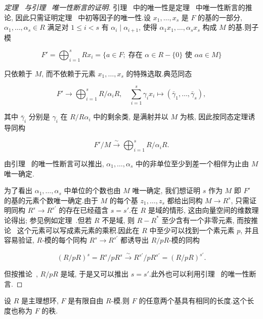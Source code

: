 \begin{proof}[定理~ 与引理~ 唯一性断言的证明]
引理~ 中的唯一性是定理~ 中唯一性断言的推论, 因此只需证明定理~ 中初等因子的唯一性.设 $x_1, \ldots, x_s$ 是 $F$ 的基的一部分, $\alpha_1, \ldots, \alpha_s \in R$ 满足对 $1 \leq i < s$ 有 $\alpha_i \mid \alpha_{i + 1}$, 使得 $\alpha_1 x_1, \ldots, \alpha_s x_s$ 构成 $M$ 的基.则子模

\[
F' = \bigoplus_{i = 1}^{s} R x_i = \{a \in F;\; \text{存在 } \alpha \in R - \{0\} \text{ 使 } \alpha a \in M\}\]

只依赖于 $M$, 而不依赖于元素 $x_1, \ldots, x_s$ 的特殊选取.典范同态

\[
F' \longrightarrow \bigoplus_{i = 1}^{s} R/\alpha_i R, \quad \sum_{i = 1}^{s} \gamma_i x_i \longmapsto (\bar{\gamma}_1, \ldots, \bar{\gamma}_s),\]

其中 $\bar{\gamma}_i$ 分别是 $\gamma_i$ 在 $R/R\alpha_i$ 中的剩余类, 是满射并以 $M$ 为核, 因此按同态定理诱导同构

\[
F'/M \xrightarrow{\sim} \bigoplus_{i = 1}^{s} R/\alpha_i R\text{.}\]

由引理~ 的唯一性断言可以推出, $\alpha_1, \ldots, \alpha_s$ 中的非单位至少到差一个相伴为止由 $M$ 唯一确定.

为了看出 $\alpha_1, \ldots, \alpha_s$ 中单位的个数也由 $M$ 唯一确定, 我们想证明 $s$ 作为 $M$ 即 $F'$ 的基的元素个数唯一确定.由于 $M$ 的每个基 $z_1, \ldots, z_s$ 都给出同构 $M \longrightarrow R^s$, 只需证明同构 $R^s \longrightarrow R^{s'}$ 的存在已经蕴含 $s = s'$.在 $R$ 是域的情形, 这由向量空间的维数理论得出; 参见例如定理~.但若 $R$ 不是域, 则 $R - R^*$ 至少含有一个非零元素, 而按推论~ 这个元素可以写成素元素的乘积.因此在 $R$ 中至少可以找到一个素元素 $p$, 并且容易验证, $R$-模的每个同构 $R^s \longrightarrow R^{s'}$ 都诱导出 $R/pR$-模的同构

\[
(R/pR)^s = R^s/pR^s \xrightarrow{\sim} R^{s'}/pR^{s'} = (R/pR)^{s'}\text{.}\]

但按推论~, $R/pR$ 是域, 于是又可以推出 $s = s'$.此外也可以利用引理~ 的唯一性断言.
\end{proof}

\begin{corollary}\label{cor:6.3.7}
设 $R$ 是主理想环, $F$ 是有限自由 $R$-模.则 $F$ 的任意两个基具有相同的长度.这个长度也称为 $F$ 的秩.
\end{corollary}


